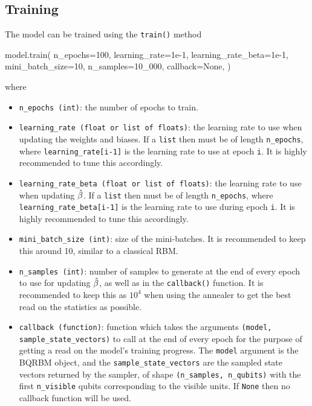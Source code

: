 \subsection{Training}
The model can be trained using the \texttt{train()} method
\begin{python}
model.train(
    n_epochs=100,
    learning_rate=1e-1,
    learning_rate_beta=1e-1,
    mini_batch_size=10,
    n_samples=10_000,
    callback=None,
)
\end{python}
where
\begin{itemize}
    \item \texttt{n\_epochs (int)}: the number of epochs to train.
    \item \texttt{learning\_rate (float or list of floats)}: the learning rate to use when updating the weights and biases. If a \texttt{list} then must be of length \texttt{n\_epochs}, where \texttt{learning\_rate[i-1]} is the learning rate to use at epoch \texttt{i}. It is highly recommended to tune this accordingly.
    \item \texttt{learning\_rate\_beta (float or list of floats)}: the learning rate to use when updating \( \hat{\beta} \). If a \texttt{list} then must be of length \texttt{n\_epochs}, where \newline\texttt{learning\_rate\_beta[i-1]} is the learning rate to use during epoch \texttt{i}. It is highly recommended to tune this accordingly.
    \item \texttt{mini\_batch\_size (int)}: size of the mini-batches. It is recommended to keep this around 10, similar to a classical RBM.
    \item \texttt{n\_samples (int)}: number of samples to generate at the end of every epoch to use for updating \( \hat{\beta} \), as well as in the \texttt{callback()} function. It is recommended to keep this as \( 10^4 \) when using the annealer to get the best read on the statistics as possible.
    \item \texttt{callback (function)}: function which takes the arguments \texttt{(model, sample\_state\_vectors)} to call at the end of every epoch for the purpose of getting a read on the model's training progress. The \texttt{model} argument is the BQRBM object, and the \texttt{sample\_state\_vectors} are the sampled state vectors returned by the sampler, of shape \texttt{(n\_samples, n\_qubits)} with the first \texttt{n\_visible} qubits corresponding to the visible units. If \texttt{None} then no callback function will be used.
\end{itemize}

